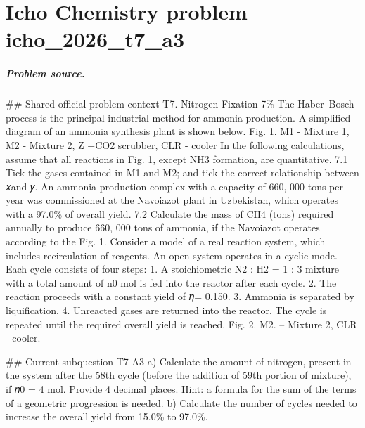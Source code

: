 
\chapter{Icho Chemistry problem icho\_2026\_t7\_a3}
\label{ch:IChO2026Problems_problem_icho_2026_t7_a3}

\paragraph{Problem source.}
\#\# Shared official problem context
T7. Nitrogen Fixation 7\% The Haber–Bosch process is the principal industrial method for ammonia production. A simplified diagram of an ammonia synthesis plant is shown below. Fig. 1. M1 - Mixture 1, M2 - Mixture 2, Z −CO2 scrubber, CLR - cooler In the following calculations, assume that all reactions in Fig. 1, except NH3 formation, are quantitative. 7.1 Tick the gases contained in M1 and M2; and tick the correct relationship between 𝑥and 𝑦. An ammonia production complex with a capacity of 660, 000 tons per year was commissioned at the Navoiazot plant in Uzbekistan, which operates with a 97.0\% of overall yield. 7.2 Calculate the mass of CH4 (tons) required annually to produce 660, 000 tons of ammonia, if the Navoiazot operates according to the Fig. 1. Consider a model of a real reaction system, which includes recirculation of reagents. An open system operates in a cyclic mode. Each cycle consists of four steps: 1. A stoichiometric N2 : H2 = 1 : 3 mixture with a total amount of n0 mol is fed into the reactor after each cycle. 2. The reaction proceeds with a constant yield of 𝜂= 0.150. 3. Ammonia is separated by liquification. 4. Unreacted gases are returned into the reactor. The cycle is repeated until the required overall yield is reached. Fig. 2. M2. – Mixture 2, CLR - cooler.

\#\# Current subquestion T7-A3
a) Calculate the amount of nitrogen, present in the system after the 58th cycle (before the addition of 59th portion of mixture), if 𝑛0 = 4 mol. Provide 4 decimal places. Hint: a formula for the sum of the terms of a geometric progression is needed. b) Calculate the number of cycles needed to increase the overall yield from 15.0\% to 97.0\%.

